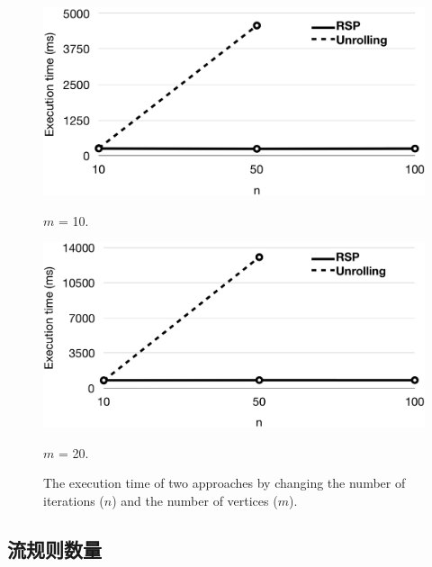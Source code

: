\documentclass{ctexart}
\begin{document}
\begin{figure}[!htbp]
	\centering
	\begin{minipage}{0.35\linewidth}
		\centering\includegraphics[width=\linewidth]{figures/lp-70.png}
		\caption{\label{fig:eval1-a} \small $m$ = 10.}
	\end{minipage}
	\hspace{0.03\linewidth}
	\begin{minipage}{0.35\linewidth}
		\centering\includegraphics[width=\linewidth]{figures/lp-71.png}
		\caption{\label{fig:eval1-b} \small $m$ = 20.}
	\end{minipage}
	\vspace{-2mm}
	\caption{\small The execution time of two approaches by changing the number of iterations ($n$) and the number of vertices ($m$).}
	\label{fig:eval1}
\end{figure}

\subsection{流规则数量}
\end{document}
